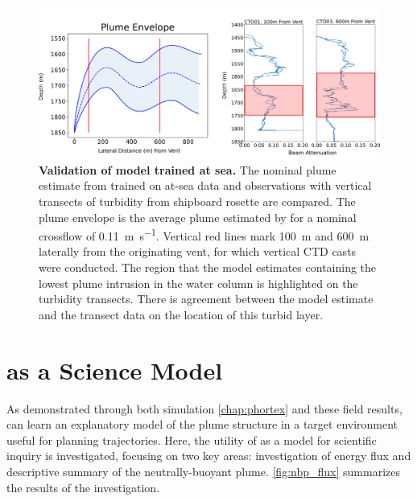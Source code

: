 \begin{figure}
    \centering
    \includegraphics[width=1\columnwidth]{figures/field_validation.png}
    \caption[Validation of \PHUMES model trained at sea.]{\textbf{Validation of \PHUMES model trained at sea.} The nominal plume estimate from \PHUMES trained on at-sea data and \Sentry observations with vertical transects of turbidity from shipboard rosette are compared. The plume envelope is the average plume estimated by \PHUMES for a nominal crossflow of \SI{0.11}{\meter\per\second}. Vertical red lines mark \SI{100}{\meter} and \SI{600}{\meter} laterally from the originating vent, for which vertical CTD casts were conducted. The region that the model estimates containing the lowest plume intrusion in the water column is highlighted on the turbidity transects. There is agreement between the model estimate and the transect data on the location of this turbid layer.} 
    \label{fig:field_valid}
\end{figure}

\section{\PHUMES as a Science Model}
\label{sec:phumes_as_science}
As demonstrated through both simulation \cref{chap:phortex} and these field results, \PHUMES can learn an explanatory model of the plume structure in a target environment useful for planning \PHORTEX trajectories. Here, the utility of \PHUMES as a model for scientific inquiry is investigated, focusing on two key areas: investigation of energy flux and descriptive summary of the neutrally-buoyant plume. \cref{fig:nbp_flux} summarizes the results of the investigation.

